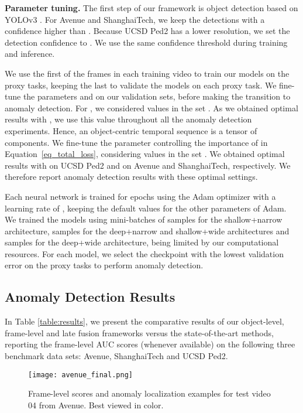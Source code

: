 \documentclass[final]{cvpr}
\begin{document}
\noindent
{\bf Parameter tuning.}
The first step of our framework is object detection based on YOLOv3 \cite{Redmon-arXiv-2018}. For Avenue and ShanghaiTech, we keep the detections with a confidence higher than . Because UCSD Ped2 has a lower resolution, we set the detection confidence to . We use the same confidence threshold during training and inference.

We use the first  of the frames in each training video to train our models on the proxy tasks, keeping the last  to validate the models on each proxy task. We fine-tune the parameters  and  on our validation sets, before making the transition to anomaly detection. For , we considered values in the set . As we obtained optimal results with , we use this value throughout all the anomaly detection experiments. Hence, an object-centric temporal sequence is a tensor of  components.
We fine-tune the parameter  controlling the importance of  in Equation~\eqref{eq_total_loss}, considering values in the set . We obtained optimal results with  on UCSD Ped2 and  on Avenue and ShanghaiTech, respectively. We therefore report anomaly detection results with these optimal settings.


Each neural network is trained for  epochs using the Adam optimizer \cite{Kingma-ICLR-2014} with a learning rate of , keeping the default values for the other parameters of Adam. We trained the models using mini-batches of  samples for the shallow+narrow architecture,  samples for the deep+narrow and shallow+wide architectures and  samples for the deep+wide architecture, being limited by our computational resources. For each model, we select the checkpoint with the lowest validation error on the proxy tasks to perform anomaly detection. 

\vspace*{-0.1cm}
\subsection{Anomaly Detection Results}
\vspace*{-0.1cm}

In Table \ref{table:results}, we present the comparative results of our object-level, frame-level and late fusion frameworks versus the state-of-the-art methods, reporting the frame-level AUC scores (whenever available) on the following three benchmark data sets: Avenue, ShanghaiTech and UCSD Ped2.

\begin{figure}[!t]
\begin{center}
\texttt{[image: avenue\_final.png]}
\end{center}
\vspace{-0.4cm}
\caption{Frame-level scores and anomaly localization examples for test video 04 from Avenue. Best viewed in color.}
\label{fig:avenue}
\vspace{-0.1cm}
\end{figure}
\end{document}
